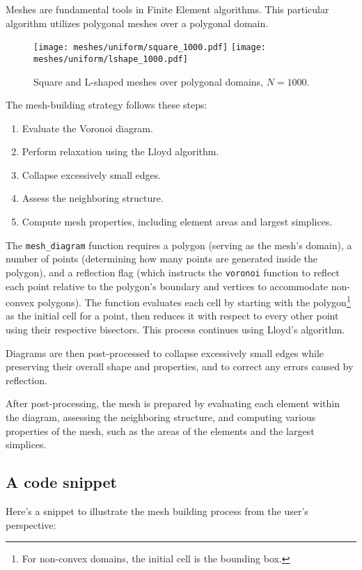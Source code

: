 Meshes are fundamental tools in Finite Element algorithms. This particular algorithm utilizes polygonal meshes over a polygonal domain.

\begin{figure}[!ht]
	\centering
	\texttt{[image: meshes/uniform/square\_1000.pdf]}
    \texttt{[image: meshes/uniform/lshape\_1000.pdf]}
	\caption{Square and L-shaped meshes over polygonal domains, $N = 1000$.}
\end{figure}

\cite{Talischi2012} The mesh-building strategy follows these steps:

\begin{enumerate}
	\item Evaluate the Voronoi diagram.
	\item Perform relaxation using the Lloyd algorithm.
	\item Collapse excessively small edges.
	\item Assess the neighboring structure.
	\item Compute mesh properties, including element areas and largest simplices.
\end{enumerate}

The \lstinline{mesh_diagram} function requires a polygon (serving as the mesh's domain), a number of points (determining how many points are generated inside the polygon), and a reflection flag (which instructs the \lstinline{voronoi} function to reflect each point relative to the polygon's boundary and vertices to accommodate non-convex polygons). The function evaluates each cell by starting with the polygon\footnote{For non-convex domains, the initial cell is the bounding box.} as the initial cell for a point, then reduces it with respect to every other point using their respective bisectors. This process continues using Lloyd's algorithm.

Diagrams are then post-processed to collapse excessively small edges while preserving their overall shape and properties, and to correct any errors caused by reflection.

After post-processing, the mesh is prepared by evaluating each element within the diagram, assessing the neighboring structure, and computing various properties of the mesh, such as the areas of the elements and the largest simplices.

\newpage
\subsection{A code snippet}

Here's a snippet to illustrate the mesh building process from the user's perspective:

